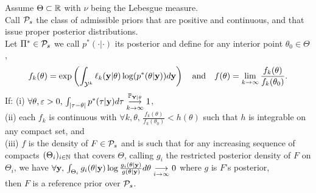 \begin{thm}\label{thm:intro-ref:explicitRP}
    Assume $\Theta\subset\RR$ with $\nu$ being the Lebesgue measure.\\
    Call $\cP_s$ the class of admissible priors that are positive and continuous, and that issue proper posterior distributions.\\
    Let $\Pi^\ast\in\cP_s$ we call $p^\ast(\cdot|\cdot)$ its posterior and define for any interior point $\theta_0\in\Theta$,
        \begin{equation}
                f_k(\theta) = \exp\left(\int_{\cY^k}\ell_k(\mbf y|\theta)\log(p^\ast(\theta|\mbf y)) d\mbf y \right) \quad\text{and}\quad  %
                f(\theta) = \lim_{k\rightarrow\infty}\frac{f_k(\theta)}{f_k(\theta_0)}.
        \end{equation}
    If: (i) $ \forall \theta,\eps>0,\,\int_{|\tau-\theta|} p^\ast(\tau|\mbf y)d\tau \conv[\PP_{\mbf Y|\theta}]{k\rightarrow\infty}1$,\\ (ii) each $f_k$ is continuous with $\forall k,\theta,\, \frac{f_k(\theta)}{f_k(\theta_0)} <h(\theta)$ such that $h$ is integrable on any compact set, and\\
    (iii) $f$ is the density of $F\in\cP_s$  and is such that for any increasing sequence of compacts $(\Theta_i)_{i\in\NN}$ that covers $\Theta$, calling $g_i$ the restricted posterior density of $F$ on $\Theta_i$, we have $\forall \mbf y,\, \int_{\Theta_i}g_i(\theta|\mbf y)\log\frac{g_i(\theta|\mbf y)}{g(\theta|\mbf y)}d\theta \conv{i\rightarrow\infty}0$ where $g$ is $F$'s posterior,\\
    then $F$ is a reference prior over $\cP_s$.
 \end{thm}


%


